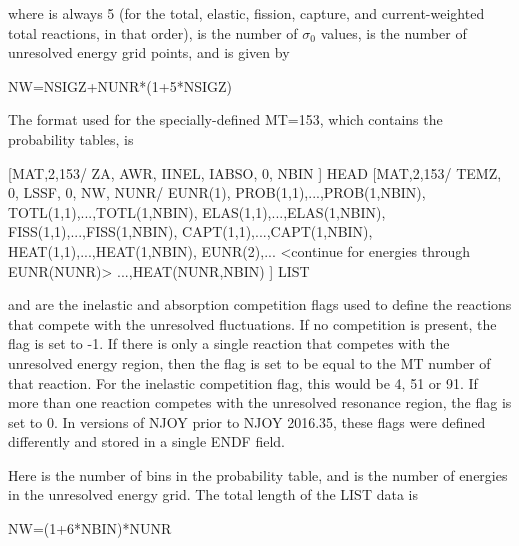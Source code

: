 \noindent
where  is always 5 (for the total, elastic,
fission, capture, and current-weighted total reactions, in that order),
 is the number of $\sigma_0$ values,  is
the number of unresolved energy grid points, and  is
given by

\newpage
\small
\begin{ccode}

   NW=NSIGZ+NUNR*(1+5*NSIGZ)

\end{ccode}
\normalsize

The format used for the specially-defined MT=153, which contains the
probability tables, is

\small
\begin{ccode}

[MAT,2,153/ ZA, AWR, IINEL, IABSO, 0, NBIN ] HEAD
[MAT,2,153/ TEMZ, 0, LSSF, 0, NW, NUNR/
            EUNR(1),
            PROB(1,1),...,PROB(1,NBIN),
            TOTL(1,1),...,TOTL(1,NBIN),
            ELAS(1,1),...,ELAS(1,NBIN),
            FISS(1,1),...,FISS(1,NBIN),
            CAPT(1,1),...,CAPT(1,NBIN),
            HEAT(1,1),...,HEAT(1,NBIN),
            EUNR(2),...
              <continue for energies through EUNR(NUNR)>
            ...,HEAT(NUNR,NBIN) ] LIST

\end{ccode}
\normalsize

\noindent
{} and  are the inelastic and absorption competition flags used
to define the reactions that compete with the unresolved fluctuations. If no
competition is present, the flag is set to -1. If there is only a single reaction that
competes with the unresolved energy region, then the flag is set to be equal to the MT
number of that reaction. For the inelastic competition flag, this would be 4, 51 or 91.
If more than one reaction competes with the unresolved resonance region, the flag is set
to 0. In versions of NJOY prior to NJOY 2016.35, these flags were defined differently and
stored in a single ENDF field.

\noindent
Here  is the number of bins in the probability table, and
 is the number of energies in the unresolved energy grid.
The total length of the LIST data is

\small
\begin{ccode}

  NW=(1+6*NBIN)*NUNR

\end{ccode}
\normalsize

